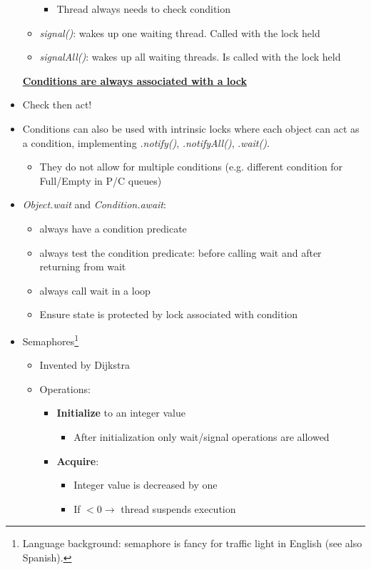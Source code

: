\documentclass[a4paper]{article}
\begin{document}
\begin{itemize}
\begin{itemize}
\begin{itemize}
\item Thread always needs to check condition
\end{itemize}
\item \textsl{signal()}: wakes up one waiting thread. Called with the lock held
\item \textsl{signalAll()}: wakes up all waiting threads. Is called with the lock held
\end{itemize}
\textbf{\underline{Conditions are always associated with a lock}}
\item Check then act! 
\item Conditions can also be used with intrinsic locks where each object can act as a condition, implementing \textsl{.notify()}, \textsl{.notifyAll()}, .\textsl{wait()}. 
\begin{itemize}
\item They do not allow for multiple conditions (e.g. different condition for Full/Empty in P/C queues)
\end{itemize}
\item \textsl{Object.wait} and \textsl{Condition.await}: 
\begin{itemize}
\item always have a condition predicate
\item always test the condition predicate: before calling wait and after returning from wait 
\item always call wait in a loop
\item Ensure state is protected by lock associated with condition
\end{itemize}
\item Semaphores\footnote{Language background: semaphore is fancy for traffic light in English (see also Spanish).} 
\begin{itemize}
\item Invented by Dijkstra
\item Operations:
\begin{itemize}
\item \textbf{Initialize} to an integer value
\begin{itemize}
\item After initialization only wait/signal operations are allowed
\end{itemize}
\item \textbf{Acquire}:
\begin{itemize}
\item Integer value is decreased by one
\item If $<0\to$ thread suspends execution

\end{itemize}
\end{itemize}
\end{itemize}
\end{itemize}
\end{document}
